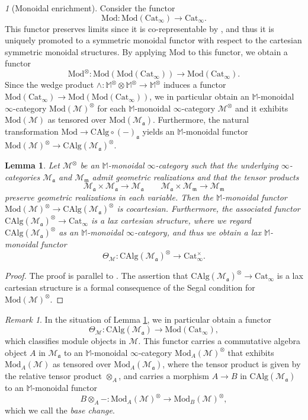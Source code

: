 \documentclass{amsart}
\theoremstyle{plain}
\newtheorem{lemma}[theorem]{Lemma}
\theoremstyle{definition}
\theoremstyle{remark}
\newtheorem{remark}[theorem]{Remark}
\newtheorem{p}[theorem]{}
\numberwithin{equation}{theorem}
\newcommand{\mcal}[1]{\mathcal{#1}}
\newcommand{\mbb}[1]{\mathbb{#1}}
\newcommand{\mfk}[1]{\mathfrak{#1}}
\newcommand{\CAlg}{\mathrm{CAlg}}
\newcommand{\Cat}{\mathrm{Cat}}
\newcommand{\Mod}{\mathrm{Mod}}
\begin{document}
\begin{p}[Monoidal enrichment]\label{p:Mod2}
Consider the functor
\[
	\Mod \colon \Mod(\Cat_\infty) \to \Cat_\infty.
\]
This functor preserves limits since it is co-representable by \cite[2.2.4.9]{HA}, and thus it is uniquely promoted to a symmetric monoidal functor with respect to the cartesian symmetric monoidal structures.
By applying $\Mod$ to this functor, we obtain a functor 
\[
	\Mod^\otimes \colon \Mod(\Mod(\Cat_\infty)) \to \Mod(\Cat_\infty).
\]
Since the wedge product $\wedge\colon\mbb{M}^\otimes\otimes\mbb{M}^\otimes\to\mbb{M}^\otimes$ induces a functor $\Mod(\Cat_\infty)\to\Mod(\Mod(\Cat_\infty))$, we in particular obtain an $\mbb{M}$-monoidal $\infty$-category $\Mod(\mcal{M})^\otimes$ for each $\mbb{M}$-monoidal $\infty$-category $\mcal{M}^\otimes$ and it exhibits $\Mod(\mcal{M})$ as tensored over $\Mod(\mcal{M}_\mfk{a})$.
Furthermore, the natural transformation $\Mod\to\CAlg\circ(-)_\mfk{a}$ yields an $\mbb{M}$-monoidal functor $\Mod(\mcal{M})^\otimes\to\CAlg(\mcal{M}_\mfk{a})^\otimes$.
\end{p}

\begin{lemma}\label{lem:Mod}
Let $\mcal{M}^\otimes$ be an $\mbb{M}$-monoidal $\infty$-category such that the underlying $\infty$-categories $\mcal{M}_\mfk{a}$ and $\mcal{M}_\mfk{m}$ admit geometric realizations and that the tensor products
\[
	\mcal{M}_\mfk{a}\times\mcal{M}_\mfk{a} \to \mcal{M}_\mfk{a} \qquad
	\mcal{M}_\mfk{a}\times\mcal{M}_\mfk{m} \to \mcal{M}_\mfk{m}
\]
preserve geometric realizations in each variable.
Then the $\mbb{M}$-monoidal functor $\Mod(\mcal{M})^\otimes\to\CAlg(\mcal{M}_\mfk{a})^\otimes$ is cocartesian.
Furthermore, the associated functor $\CAlg(\mcal{M}_\mfk{a})^\otimes\to\Cat_\infty$ is a lax cartesian structure, where we regard $\CAlg(\mcal{M}_\mfk{a})^\otimes$ as an $\mbb{M}$-monoidal $\infty$-category, and thus we obtain a lax $\mbb{M}$-monoidal functor
\[
	\Theta_\mcal{M} \colon \CAlg(\mcal{M}_\mfk{a})^\otimes \to \Cat_\infty^\times.
\]
\end{lemma}
\begin{proof}
The proof is parallel to \cite[4.5.3.1]{HA}.
The assertion that $\CAlg(\mcal{M}_\mfk{a})^\otimes\to\Cat_\infty$ is a lax cartesian structure is a formal consequence of the Segal condition for $\Mod(\mcal{M})^\otimes$.
\end{proof}

\begin{remark}
In the situation of Lemma \ref{lem:Mod}, we in particular obtain a functor
\[
	\Theta_\mcal{M} \colon \CAlg(\mcal{M}_\mfk{a}) \to \Mod(\Cat_\infty),
\]
which classifies module objects in $\mcal{M}$.
This functor carries a commutative algebra object $A$ in $\mcal{M}_\mfk{a}$ to an $\mbb{M}$-monoidal $\infty$-category $\Mod_A(\mcal{M})^\otimes$ that exhibits $\Mod_A(\mcal{M})$ as tensored over $\Mod_A(\mcal{M}_\mfk{a})$, where the tensor product is given by the relative tensor product $\otimes_A$, and carries a morphism $A\to B$ in $\CAlg(\mcal{M}_\mfk{a})$ to an $\mbb{M}$-monoidal functor
\[
	B\otimes_A- \colon \Mod_A(\mcal{M})^\otimes \to \Mod_B(\mcal{M})^\otimes,
\]
which we call the \textit{base change}.
\end{remark}
\end{document}
